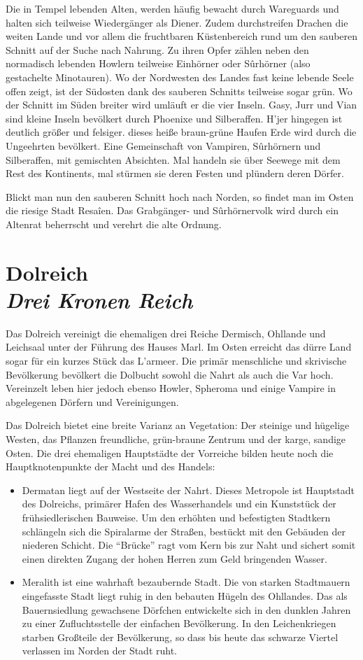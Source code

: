 Die in Tempel lebenden Alten, werden häufig bewacht durch Wareguards und halten sich teilweise Wiedergänger als Diener. Zudem durchstreifen Drachen die weiten Lande und vor allem die fruchtbaren Küstenbereich rund um den sauberen Schnitt auf der Suche nach Nahrung. Zu ihren Opfer zählen neben den normadisch lebenden Howlern teilweise Einhörner oder Sûrhörner (also gestachelte Minotauren). Wo der Nordwesten des Landes fast keine lebende Seele offen zeigt, ist der Südosten dank des sauberen Schnitts teilweise sogar grün. Wo der Schnitt im Süden breiter wird umläuft er die vier Inseln. Gasy, Jurr und Vian sind kleine Inseln bevölkert durch Phoenixe und Silberaffen. H’jer hingegen ist deutlich größer und felsiger. dieses heiße braun-grüne Haufen Erde wird durch die Ungeehrten bevölkert. Eine Gemeinschaft von Vampiren, Sûrhörnern und Silberaffen, mit gemischten Absichten. Mal handeln sie über Seewege mit dem Rest des Kontinents, mal stürmen sie deren Festen und plündern deren Dörfer.

Blickt man nun den sauberen Schnitt hoch nach Norden, so findet man im Osten die riesige Stadt Resaîen. Das Grabgänger- und Sûrhörnervolk wird durch ein Altenrat beherrscht und verehrt die alte Ordnung.

\section*{Dolreich \\ \textit{Drei Kronen Reich}}
Das Dolreich vereinigt die ehemaligen drei Reiche Dermisch, Ohllande und Leichsaal unter der Führung des Hauses Marl.  Im Osten erreicht das dürre Land sogar für ein kurzes Stück das L’armeer. Die primär menschliche und skrivische Bevölkerung bevölkert die Dolbucht sowohl die Nahrt als auch die Var hoch. Vereinzelt leben hier jedoch ebenso Howler, Spheroma und einige Vampire in abgelegenen Dörfern und Vereinigungen.

Das Dolreich bietet eine breite Varianz an Vegetation: Der steinige und hügelige Westen, das Pflanzen freundliche, grün-braune Zentrum und der karge, sandige Osten. Die drei ehemaligen Hauptstädte der Vorreiche bilden heute noch die Hauptknotenpunkte der Macht und des Handels:
\begin{itemize}
    \item Dermatan liegt auf der Westseite der Nahrt. Dieses Metropole ist Hauptstadt des Dolreichs, primärer Hafen des Wasserhandels und ein Kunststück der frühsiedlerischen Bauweise. Um den erhöhten und befestigten Stadtkern schlängeln sich die Spiralarme der Straßen, bestückt mit den Gebäuden der niederen Schicht. Die “Brücke” ragt vom Kern bis zur Naht und sichert somit einen direkten Zugang der hohen Herren zum Geld bringenden Wasser.
    \item Meralith ist eine wahrhaft bezaubernde Stadt. Die von starken Stadtmauern eingefasste Stadt liegt ruhig in den bebauten Hügeln des Ohllandes. Das als Bauernsiedlung gewachsene Dörfchen entwickelte sich in den dunklen Jahren zu einer Zufluchtsstelle der einfachen Bevölkerung. In den Leichenkriegen starben Großteile der Bevölkerung, so dass bis heute das schwarze Viertel verlassen im Norden der Stadt ruht.
\end{itemize}

